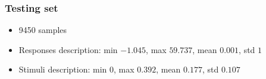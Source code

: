 \subsubsection{Testing set}
\begin{itemize}
\item 9450 samples
\item Responses description: min $-1.045$, max $59.737$, mean $0.001$, std $1$
\item Stimuli description: min $0$, max $0.392$, mean $0.177$, std $0.107$
\end{itemize}

